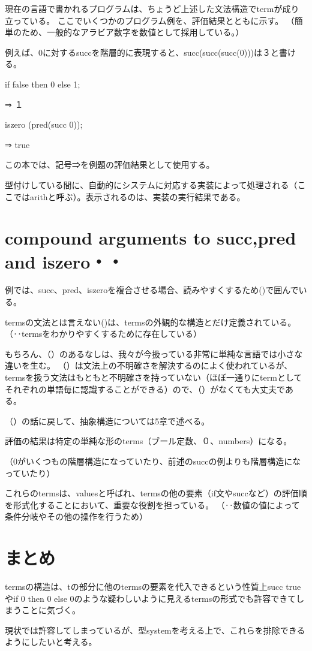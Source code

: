 \documentclass{jsarticle}
\begin{document}
{現在の言語で書かれるプログラムは、ちょうど上述した文法構造でtermが成り立っている。
ここでいくつかのプログラム例を、評価結果とともに示す。
（簡単のため、一般的なアラビア数字を数値として採用している。）

\vspace*{1zw}

例えば、0に対するsuccを階層的に表現すると、succ(succ(succ(0)))は３と書ける。

\vspace*{1zw}

if  false  then  0  else  1;

⇒  １

\vspace*{1zw}
iszero  (pred(succ  0));

⇒  true

\vspace*{1zw}


この本では、記号⇒を例題の評価結果として使用する。

型付けしている間に、自動的にシステムに対応する実装によって処理される（ここではarithと呼ぶ）。表示されるのは、実装の実行結果である。

\newpage
\section{compound arguments to succ,pred and iszero・・}

例では、succ、pred、iszeroを複合させる場合、読みやすくするため()で囲んでいる。

termsの文法とは言えない()は、termsの外観的な構造とだけ定義されている。
（‥termsをわかりやすくするために存在している）

\vspace*{1zw}
もちろん、（）のあるなしは、我々が今扱っている非常に単純な言語では小さな違いを生む。
（）は文法上の不明確さを解決するのによく使われているが、termsを扱う文法はもともと不明確さを持っていない（ほぼ一通りにtermとしてそれぞれの単語毎に認識することができる）ので、（）がなくても大丈夫である。


（）の話に戻して、抽象構造については5章で述べる。

\vspace*{1zw}
評価の結果は特定の単純な形のterms（ブール定数、０、numbers）になる。

（0がいくつもの階層構造になっていたり、前述のsuccの例よりも階層構造になっていたり）

\vspace*{1zw}
これらのtermsは、valuesと呼ばれ、termsの他の要素（if文やsuccなど）の評価順を形式化することにおいて、重要な役割を担っている。
（‥数値の値によって条件分岐やその他の操作を行うため）

\vspace*{1zw}
\section{まとめ}

termsの構造は、tの部分に他のtermsの要素を代入できるという性質上succ trueやif 0 then 0 else 0のような疑わしいように見えるtermsの形式でも許容できてしまうことに気づく。



現状では許容してしまっているが、型systemを考える上で、これらを排除できるようにしたいと考える。

\vspace*{1zw}

}
\end{document}
